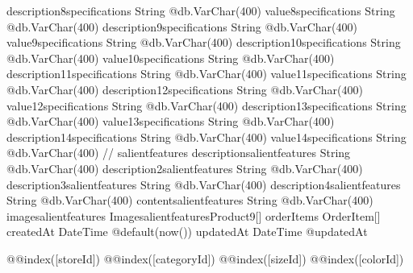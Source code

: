 {  description8specifications   String                         @db.VarChar(400)
  value8specifications         String                         @db.VarChar(400)
  description9specifications   String                         @db.VarChar(400)
  value9specifications         String                         @db.VarChar(400)
  description10specifications  String                         @db.VarChar(400)
  value10specifications        String                         @db.VarChar(400)
  description11specifications  String                         @db.VarChar(400)
  value11specifications        String                         @db.VarChar(400)
  description12specifications  String                         @db.VarChar(400)
  value12specifications        String                         @db.VarChar(400)
  description13specifications  String                         @db.VarChar(400)
  value13specifications        String                         @db.VarChar(400)
  description14specifications  String                         @db.VarChar(400)
  value14specifications        String                         @db.VarChar(400)
  // salientfeatures
  descriptionsalientfeatures   String                         @db.VarChar(400)
  description2salientfeatures  String                         @db.VarChar(400)
  description3salientfeatures  String                         @db.VarChar(400)
  description4salientfeatures  String                         @db.VarChar(400)
  contentsalientfeatures       String                         @db.VarChar(400)
  imagesalientfeatures ImagesalientfeaturesProduct9[]
  orderItems                   OrderItem[]
  createdAt                    DateTime                       @default(now())
  updatedAt                    DateTime                       @updatedAt

  @@index([storeId])
  @@index([categoryId])
  @@index([sizeId])
  @@index([colorId])
}

